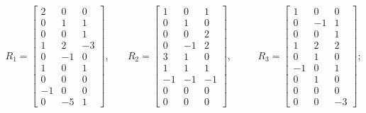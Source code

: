 \documentclass[11pt,reqno,oneside,a4paper]{article}
\theoremstyle{plain} %
\theoremstyle{definition}
\theoremstyle{remark}
\begin{document}
\begin{equation*}
\begin{aligned}
R_1 = \begin{bmatrix} 2 & 0 & 0 \\ 0 & 1 & 1 \\ 0 & 0 & 1 \\ 1 & 2 & -3 \\ 0 & -1 & 0 \\ 1 & 0 & 1 \\ 0 & 0 & 0 \\ -1 & 0 & 0 \\ 0 & -5 & 1 \end{bmatrix}, &\quad R_2 = \begin{bmatrix} 1 & 0 & 1 \\ 0 & 1 & 0 \\ 0 & 0 & 2 \\ 0 & -1 & 2 \\ 3 & 1 & 0 \\ 1 & 1 & 1 \\ -1 & -1 & -1 \\ 0 & 0 & 0 \\ 0 & 0 & 0 \end{bmatrix}, &&\quad R_3 = \begin{bmatrix} 1 & 0 & 0 \\ 0 & -1 & 1 \\ 0 & 0 & 1 \\ 1 & 2 & 2 \\ 0 & 1 & 0 \\ -1 & 0 & 1 \\ 0& 1 & 0 \\ 0 & 0 & 0 \\ 0 & 0 & -3 \end{bmatrix}; \\

\end{aligned}
\end{equation*}
\end{document}
